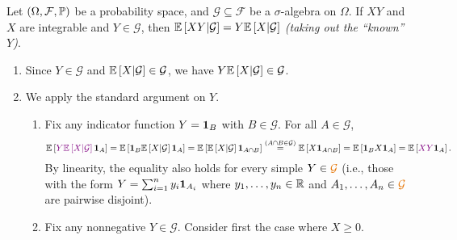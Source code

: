 \begin{enumerate}
\begin{proposition}
\label{prp:towik}
Let \((\Omega,\mathcal{F},\mathbb{P})\) be a probability space, and
\(\mathcal{G}\subseteq \mathcal{F}\) be a \(\sigma\)-algebra on \(\Omega\). If
\(XY\) and \(X\) are integrable and \(Y\in\mathcal{G}\), then \(\mathbb{E}\left[XY|\mathcal{G}\right]
=Y\mathbb{E}\left[X|\mathcal{G}\right]\) \emph{(taking out the ``known'' \(Y\))}.
\end{proposition}
\begin{pf}
\begin{enumerate}[label={(\arabic*)}]
\item Since \(Y\in\mathcal{G}\) and \(\mathbb{E}\left[X|\mathcal{G}\right]\in\mathcal{G}\),
we have \(Y\mathbb{E}\left[X|\mathcal{G}\right]\in\mathcal{G}\).
\item We apply the standard argument on \(Y\).
\begin{enumerate}
\item Fix any indicator function \(Y=\mathbf{1}_{B}\) with \(B\in\mathcal{G}\).
For all \(A\in\mathcal{G}\),
\[
\expv{\vc{Y\expv{X|\mathcal{G}}}\indic_{A}}
=\expv{\indic_{B}\expv{X|\mathcal{G}}\indic_{A}}
=\expv{\expv{X|\mathcal{G}}\indic_{A\cap B}}
\overset{(A\cap B\in\mathcal{G})}{=}
\expv{X\indic_{A\cap B}}
=\expv{\indic_{B}X\indic_{A}}
=\expv{\vc{XY}\indic_{A}}.
\]
By linearity, the equality also holds for every simple \(Y\in\orc{\mathcal{G}}\)
(i.e., those with the form \(Y=\sum_{i=1}^{n}y_i\mathbf{1}_{A_i}\) where
\(y_1,\dotsc,y_n\in\mathbb{R}\) and \(A_1,\dotsc,A_n\in\orc{\mathcal{G}}\) are pairwise
disjoint).
\item Fix any nonnegative \(Y\in\mathcal{G}\). Consider first the case
where \(X\ge 0\).


\end{enumerate}
\end{enumerate}
\end{pf}
\end{enumerate}
